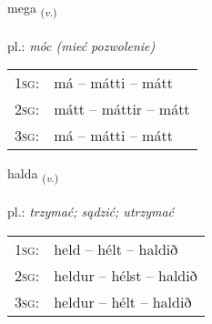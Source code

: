 \documentclass[frontgrid, backgrid]{flacards}\usepackage[]{graphicx}\usepackage[]{xcolor}
\begin{document}
\renewcommand{\blhead}{\vskip5pt {\small\bfseries\footnotesize Sagnorð | Verb }}
\renewcommand{\bcfoot}{\vskip5pt \hspace{2pt}{\small\bfseries\footnotesize 1K}}


{mega \small{\textsubscript{(\textit{v.})}} \\[1ex] %
\textphonetic{[meiːɣa]} \\
pl.: \emph{móc (mieć pozwolenie)} \\  [2ex]
\renewcommand*{\arraystretch}{0.8}
\begin{tabular}{p{1cm}l}
\textsc{1sg}: & má -- mátti -- mátt \\ 
\textsc{2sg}: & mátt -- máttir -- mátt \\ 
\textsc{3sg}: & má -- mátti -- mátt \\ 
\end{tabular}
}

\renewcommand{\flhead}{\vskip5pt \fboxsep=0pt {\small\bfseries\footnotesize Sagnorð | Verb}}
\renewcommand{\fcfoot}{\vskip5pt \fboxsep=0pt \hspace{2pt}{\small\bfseries\footnotesize 1K}}

\renewcommand{\blhead}{\vskip5pt {\small\bfseries\footnotesize Sagnorð | Verb }}
\renewcommand{\bcfoot}{\vskip5pt \hspace{2pt}{\small\bfseries\footnotesize 1K}}


{halda \small{\textsubscript{(\textit{v.})}} \\[1ex] %
\textphonetic{[halta]} \\
pl.: \emph{trzymać; sądzić; utrzymać} \\  [2ex]
\renewcommand*{\arraystretch}{0.8}
\begin{tabular}{p{1cm}l}
\textsc{1sg}: & held -- hélt -- haldið \\ 
\textsc{2sg}: & heldur -- hélst -- haldið \\ 
\textsc{3sg}: & heldur -- hélt -- haldið \\ 
\end{tabular}
}

\renewcommand{\flhead}{\vskip5pt \fboxsep=0pt {\small\bfseries\footnotesize Fornafn | Pronoun}}
\renewcommand{\fcfoot}{\vskip5pt \fboxsep=0pt \hspace{2pt}{\small\bfseries\footnotesize 1K}}
\end{document}

